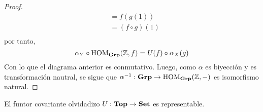 \documentclass[12pt]{report}
\newcounter{it}
\theoremstyle{largebreak}
\newcommand\cf[3]{\ensuremath{#1:#2\rightarrow#3}}
\newcommand{\Cat}[1]{\ensuremath{\textup{\textbf{#1}}}}
\begin{document}
\begin{proof}
\begin{equation*}
\begin{split}
                &=f(g(1))\\
                &=(f\circ g)(1)\\
            \end{split}
        \end{equation*}
        por tanto,
        \begin{equation*}
            \alpha_Y\circ\HOM{\Cat{Grp}}(\mathbb{Z},f)=U(f)\circ \alpha_X(g)
        \end{equation*}
        Con lo que el diagrama anterior es conmutativo. Luego, como $\alpha$ es biyección y es transformación nautral, se sigue que $\cf{\alpha^{-1}}{\Cat{Grp}}{\HOM{\Cat{Grp}}(\mathbb{Z},-)}$ es isomorfismo natural.
    \end{proof}

    \begin{exa}
        El funtor covariante olvidadizo $\cf{U}{\Cat{Top}}{\Cat{Set}}$ es representable.
    \end{exa}
\end{document}
